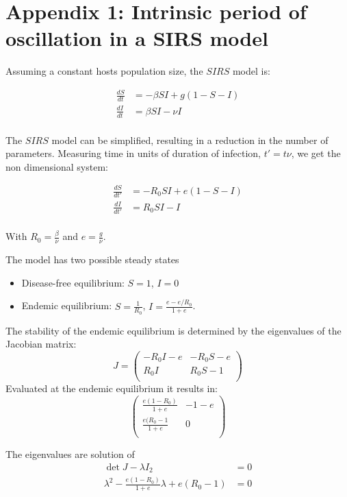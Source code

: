 
\section{Appendix 1: Intrinsic period of oscillation in a SIRS model}
\label{sec:appendix1}

Assuming a constant hosts population size, the $SIRS$ model is:

\begin{align}
  \frac{dS}{dt} & = -\beta S I + g (1-S-I)\\
  \frac{dI}{dt} & = \beta S I - \nu I\\
\end{align}

The $SIRS$ model can be simplified, resulting in a
reduction in the number of parameters. Measuring time
in units of duration of infection, $t'=t \nu$, we get the non dimensional system:

\begin{align*}
  \frac{dS}{dt'} & = -R_0 S I + e (1-S-I)\\
  \frac{dI}{dt'} & = R_0 S I - I\\
\end{align*}

With $R_0=\frac{\beta}{\nu}$ and $e=\frac{g}{\nu}$.

The model has two possible steady states
\begin{itemize}
\item Disease-free equilibrium: $S=1$, $I=0$
\item Endemic equilibrium: $S=\frac{1}{R_0}$, $I=\frac{e-e/R_0}{1+e}$.
\end{itemize}

The stability of the endemic equilibrium is determined by the
eigenvalues of the Jacobian matrix:
$$J=
\begin{pmatrix}
  -R_0 I -e & -R_0 S -e\\
  R_0 I & R_0 S-1 \\
\end{pmatrix}$$
Evaluated at the endemic equilibrium it results in:
$$\begin{pmatrix}
\frac{e(1-R_0)}{1+e} & -1-e \\
\frac{e(R_0 -1}{1+e} & 0 \\
\end{pmatrix}$$

The eigenvalues are solution of
\begin{align*}
\det{J-\lambda I_2} & = 0 \\
\lambda^2 - \frac{e(1-R_0)}{1+e} \lambda +e(R_0-1) & =0\\
\end{align*}


